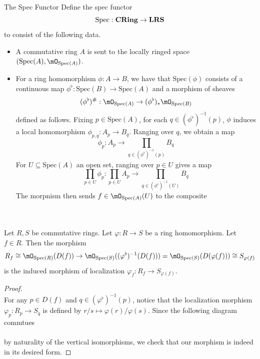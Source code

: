 \documentclass[a4paper]{article}
\begin{document}
\begin{defn}{The Spec Functor}{} Define the spec functor $$\text{Spec}:\bold{CRing}\to\bold{LRS}$$ to consist of the following data. 
\begin{itemize}
\item A commutative ring $A$ is sent to the locally ringed space $(\text{Spec}(A),\mO_{\text{Spec}(A)})$. 
\item For a ring homomorphism $\phi:A\to B$, we have that $\text{Spec}(\phi)$ consists of a continuous map $\phi^\flat:\text{Spec}(B)\to\text{Spec}(A)$ and a morphism of sheaves $$(\phi^\flat)^\#:\mO_{\text{Spec}(A)}\to(\phi^\flat)_\ast\mO_{\text{Spec}(B)}$$ defined as follows. 
Fixing $p\in\text{Spec}(A)$, for each $q\in(\phi^\flat)^{-1}(p)$, $\phi$ induces a local homomorphism $\phi_{p,q}:A_p\to B_q$. Ranging over $q$, we obtain a map $$\phi_p:A_p\to\prod_{q\in(\phi^\flat)^{-1}(p)}B_q$$ For $U\subseteq\text{Spec}(A)$ an open set, ranging over $p\in U$ gives a map $$\prod_{p\in U}\phi_p:\prod_{p\in U}A_p\to\prod_{q\in(\phi^\flat)^{-1}(U)}B_q$$ The morpnism then sends $f\in\mO_{\text{Spec}(A)}(U)$ to the composite \\
 \\
\end{itemize}
\end{defn}

\begin{lmm}{}{}\\
Let $R,S$ be commutative rings. Let $\varphi:R\to S$ be a ring homomorphism. Let $f\in R$. Then the morphism $$R_f\cong\mO_{\text{Spec}(R)}(D(f))\to\mO_{\text{Spec}(S)}((\varphi^\flat)^{-1}(D(f)))=\mO_{\text{Spec}(S)}(D(\varphi(f)))\cong S_{\varphi(f)}$$ is the induced morphism of localization $\varphi_f:R_f\to S_{\varphi(f)}$. 
\begin{proof}\\
For any $p\in D(f)$ and $q\in(\varphi^\flat)^{-1}(p)$, notice that the localization morphism $\varphi_p:R_p\to S_q$ is defined by $r/s\mapsto\varphi(r)/\varphi(s)$. Since the following diagram commtues \\
 \\
by naturality of the vertical isomorphisms, we check that our morphism is indeed in its desired form. 
\end{proof}
\end{lmm}
\end{document}
